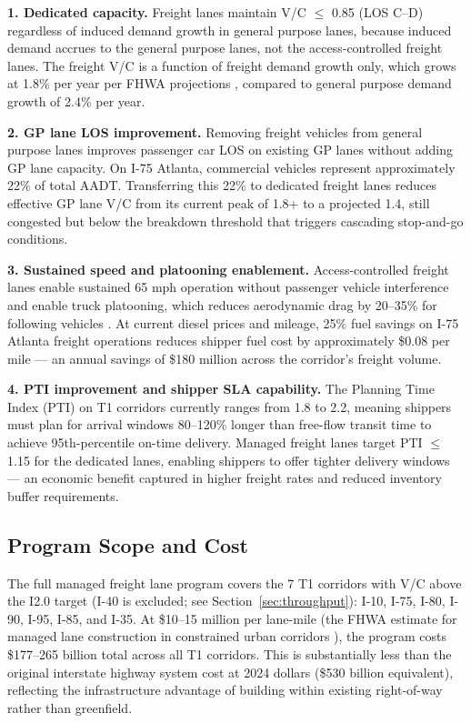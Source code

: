 \textbf{1. Dedicated capacity.} Freight lanes maintain V/C $\leq$ 0.85 (LOS C--D) regardless of induced demand growth in general purpose lanes, because induced demand accrues to the general purpose lanes, not the access-controlled freight lanes. The freight V/C is a function of freight demand growth only, which grows at 1.8\% per year per FHWA projections \citep{FHWA_freight2023}, compared to general purpose demand growth of 2.4\% per year.

\textbf{2. GP lane LOS improvement.} Removing freight vehicles from general purpose lanes improves passenger car LOS on existing GP lanes without adding GP lane capacity. On I-75 Atlanta, commercial vehicles represent approximately 22\% of total AADT. Transferring this 22\% to dedicated freight lanes reduces effective GP lane V/C from its current peak of 1.8+ to a projected 1.4, still congested but below the breakdown threshold that triggers cascading stop-and-go conditions.

\textbf{3. Sustained speed and platooning enablement.} Access-controlled freight lanes enable sustained 65 mph operation without passenger vehicle interference and enable truck platooning, which reduces aerodynamic drag by 20--35\% for following vehicles \citep{Browand2004}. At current diesel prices and mileage, 25\% fuel savings on I-75 Atlanta freight operations reduces shipper fuel cost by approximately \$0.08 per mile --- an annual savings of \$180 million across the corridor's freight volume.

\textbf{4. PTI improvement and shipper SLA capability.} The Planning Time Index (PTI) on T1 corridors currently ranges from 1.8 to 2.2, meaning shippers must plan for arrival windows 80--120\% longer than free-flow transit time to achieve 95th-percentile on-time delivery. Managed freight lanes target PTI $\leq$ 1.15 for the dedicated lanes, enabling shippers to offer tighter delivery windows --- an economic benefit captured in higher freight rates and reduced inventory buffer requirements.

\subsection*{Program Scope and Cost}

The full managed freight lane program covers the 7 T1 corridors with V/C above the I2.0 target (I-40 is excluded; see Section~\ref{sec:throughput}): I-10, I-75, I-80, I-90, I-95, I-85, and I-35. At \$10--15 million per lane-mile (the FHWA estimate for managed lane construction in constrained urban corridors \citep{FHWA_ML2021}), the program costs \$177--265 billion total across all T1 corridors. This is substantially less than the original interstate highway system cost at 2024 dollars (\$530 billion equivalent), reflecting the infrastructure advantage of building within existing right-of-way rather than greenfield.

